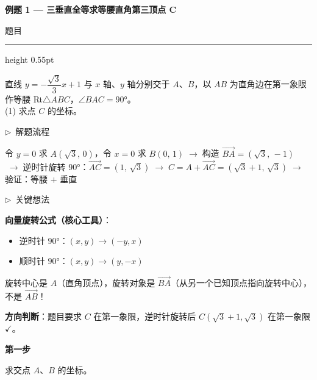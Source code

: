 \documentclass{exam-zh}
\newcommand{\edukai}{\kaishu}
\newcommand{\eduSectionTitle}[1]{%
  \needspace{5\baselineskip}%
  \vspace{2mm}
  {\color{edu-blue}\bfseries\large #1}\par
  \vspace{3mm}
}
\newenvironment{eduSubQuestionItem}[1]{%
  \needspace{4\baselineskip}%
  \vspace{2mm}
  \par\noindent
  \hangindent=8mm\hangafter=1
  {\color{edu-blue}\bfseries #1}\enspace
  \begingroup
  \color{edu-ink}
}{%
  \endgroup
  \par
  \vspace{3mm}
}
\newenvironment{eduAuxItem}[1]{%
  \needspace{4\baselineskip}%
  \vspace{2mm}
  \par\noindent
  \hangindent=8mm\hangafter=1
  {\color{edu-blue}\edukai $\triangleright$~#1}\enspace
  \begingroup
  \color{edu-ink}
  \edukai
}{%
  \endgroup
  \par
  \vspace{4mm}
}
\newenvironment{eduProblemBlock}[1][题目]{%
  \needspace{8\baselineskip}
  {\small\color{edu-muted}#1}\par
  \vspace{1.5mm}
  {\color{edu-blue}\hrule height 0.55pt}
  \vspace{4.5mm}
  \begingroup
  \color{edu-ink}
  \large
  \setlength{\parskip}{2.2mm}
  \linespread{1.20}\selectfont
}{%
  \par
  \endgroup
  \vspace{6mm}
}
\begin{document}
\eduSectionTitle{例题 1 — 三垂直全等求等腰直角第三顶点 C}

\begin{eduProblemBlock}[题目]
直线 $y = -\dfrac{\sqrt{3}}{3}x + 1$ 与 $x$ 轴、$y$ 轴分别交于 $A$、$B$，以 $AB$ 为直角边在第一象限作等腰 Rt$\triangle ABC$，$\angle BAC = 90°$。\\
(1) 求点 $C$ 的坐标。

\end{eduProblemBlock}









\begin{eduAuxItem}{解题流程}
令 $y=0$ 求 $A(\sqrt{3},\,0)$，令 $x=0$ 求 $B(0,\,1)$$\;\to\;$构造 $\overrightarrow{BA}=(\sqrt{3},\,-1)$$\;\to\;$逆时针旋转 $90°$：$\overrightarrow{AC}=(1,\,\sqrt{3})$$\;\to\;$$C = A + \overrightarrow{AC} = (\sqrt{3}+1,\,\sqrt{3})$$\;\to\;$验证：等腰 $+$ 垂直\end{eduAuxItem}




\begin{eduAuxItem}{关键想法}
\textbf{向量旋转公式（核心工具）}：
\begin{itemize}
  \item 逆时针 $90°$：$(x, y) \to (-y, x)$
  \item 顺时针 $90°$：$(x, y) \to (y, -x)$
\end{itemize}
旋转中心是 $A$（直角顶点），旋转对象是 $\overrightarrow{BA}$（从另一个已知顶点指向旋转中心），不是 $\overrightarrow{AB}$！

\textbf{方向判断}：题目要求 $C$ 在第一象限，逆时针旋转后 $C(\sqrt{3}+1,\sqrt{3})$ 在第一象限 $\checkmark$。
\end{eduAuxItem}




\begin{eduSubQuestionItem}{第一步}
求交点 $A$、$B$ 的坐标。\end{eduSubQuestionItem}
\end{document}
